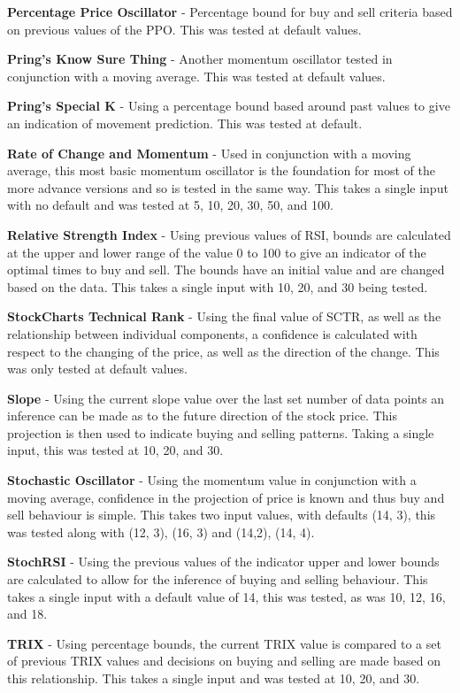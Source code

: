 \documentclass[conference]{IEEEtran}
\begin{document}
\textbf{Percentage Price Oscillator} - Percentage bound for buy and sell criteria based on previous values of the PPO. This was tested at default values.

\textbf{Pring's Know Sure Thing} - Another momentum oscillator tested in conjunction with a moving average. This was tested at default values.

\textbf{Pring's Special K} - Using a percentage bound based around past values to give an indication of movement prediction. This was tested at default. 

\textbf{Rate of Change and Momentum} - Used in conjunction with a moving average, this most basic momentum oscillator is the foundation for most of the more advance versions and so is tested in the same way. This takes a single input with no default and was tested at 5, 10, 20, 30, 50, and 100.

\textbf{Relative Strength Index} - Using previous values of RSI, bounds are calculated at the upper and lower range of the value 0 to 100 to give an indicator of the optimal times to buy and sell. The bounds have an initial value and are changed based on the data. This takes a single input with 10, 20, and 30 being tested.

\textbf{StockCharts Technical Rank} - Using the final value of SCTR, as well as the relationship between individual components, a confidence is calculated with respect to the changing of the price, as well as the direction of the change. This was only tested at default values.

\textbf{Slope} - Using the current slope value over the last set number of data points an inference can be made as to the future direction of the stock price. This projection is then used to indicate buying and selling patterns. Taking a single input, this was tested at 10, 20, and 30.

\textbf{Stochastic Oscillator} - Using the momentum value in conjunction with a moving average, confidence in the projection of price is known and thus buy and sell behaviour is simple. This takes two input values, with defaults (14, 3), this was tested along with (12, 3), (16, 3) and (14,2), (14, 4).

\textbf{StochRSI} - Using the previous values of the indicator upper and lower bounds are calculated to allow for the inference of buying and selling behaviour. This takes a single input with a default value of 14, this was tested, as was 10, 12, 16, and 18.

\textbf{TRIX} - Using percentage bounds, the current TRIX value is compared to a set of previous TRIX values and decisions on buying and selling are made based on this relationship. This takes a single input and was tested at 10, 20, and 30. 
\end{document}
